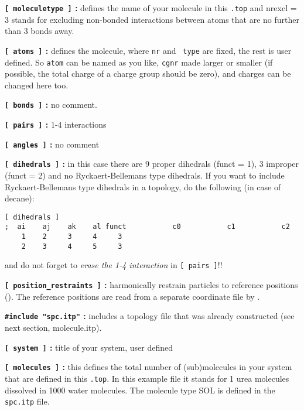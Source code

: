 {\bf {\tt [~moleculetype~]} :} defines the name of your molecule in
this {\tt *.top} and nrexcl = 3 stands for excluding non-bonded
interactions between atoms that are no further than 3 bonds away.

{\bf {\tt [~atoms~]} :} defines the molecule, where {\tt nr} and {\tt
type} are fixed, the rest is user defined. So {\tt atom} can be named
as you like, {\tt cgnr} made larger or smaller (if possible, the total
charge of a charge group should be zero), and charges can be changed
here too.

{\bf {\tt [~bonds~]} :} no comment.

{\bf {\tt [~pairs~]} :} 1-4 interactions

{\bf {\tt [~angles~]} :} no comment

{\bf {\tt [~dihedrals~]} :} in this case there are 9 proper dihedrals
(funct = 1), 3 improper (funct = 2) and no Ryckaert-Bellemans type
dihedrals. If you want to include Ryckaert-Bellemans type dihedrals
in a topology, do the following (in case of {\eg} decane):
\begin{verbatim}
[ dihedrals ]
;  ai    aj    ak    al funct           c0           c1           c2
    1    2     3     4     3 
    2    3     4     5     3
\end{verbatim}
and do not forget to {\em erase the 1-4 interaction} 
in {\tt [~pairs~]}!!

{\bf {\tt [~position\_restraints~]} :} harmonically restrain particles
to reference positions (). 
The reference positions are read from a 
separate coordinate file by .

{\bf {\tt \#include "spc.itp"} :} includes a topology file that was already
constructed (see next section, molecule.itp).

{\bf {\tt [~system~]} :} title of your system, user defined

{\bf {\tt [~molecules~]} :} this defines the total number of (sub)molecules
in your system that are defined in this {\tt *.top}. In this
example file it stands for 1 urea molecules dissolved in 1000 water
molecules. The molecule type SOL is defined in the {\tt spc.itp} file.

